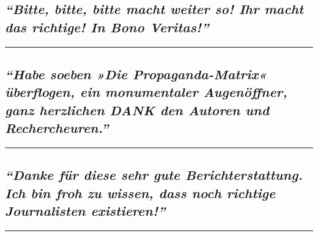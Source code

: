 \hypertarget{bitte-bitte-bitte-macht-weiter-so-ihr-macht-das-richtige-in-bono-veritas}{%
\subsection{\texorpdfstring{\emph{``Bitte, bitte, bitte macht weiter so!
Ihr macht das richtige! In Bono
Veritas!''}}{``Bitte, bitte, bitte macht weiter so! Ihr macht das richtige! In Bono Veritas!''}}\label{bitte-bitte-bitte-macht-weiter-so-ihr-macht-das-richtige-in-bono-veritas}}

\begin{center}\rule{0.5\linewidth}{\linethickness}\end{center}

\hypertarget{habe-soeben-die-propaganda-matrix-uxfcberflogen-ein-monumentaler-augenuxf6ffner-ganz-herzlichen-dank-den-autoren-und-rechercheuren}{%
\subsection{\texorpdfstring{\emph{``Habe soeben »Die Propaganda-Matrix«
überflogen, ein monumentaler Augenöffner, ganz herzlichen DANK den
Autoren und
Rechercheuren.''}}{``Habe soeben »Die Propaganda-Matrix« überflogen, ein monumentaler Augenöffner, ganz herzlichen DANK den Autoren und Rechercheuren.''}}\label{habe-soeben-die-propaganda-matrix-uxfcberflogen-ein-monumentaler-augenuxf6ffner-ganz-herzlichen-dank-den-autoren-und-rechercheuren}}

\begin{center}\rule{0.5\linewidth}{\linethickness}\end{center}

\hypertarget{danke-fuxfcr-diese-sehr-gute-berichterstattung-ich-bin-froh-zu-wissen-dass-noch-richtige-journalisten-existieren}{%
\subsection{\texorpdfstring{\emph{``Danke für diese sehr gute
Berichterstattung. Ich bin froh zu wissen, dass noch richtige
Journalisten
existieren!''}}{``Danke für diese sehr gute Berichterstattung. Ich bin froh zu wissen, dass noch richtige Journalisten existieren!''}}\label{danke-fuxfcr-diese-sehr-gute-berichterstattung-ich-bin-froh-zu-wissen-dass-noch-richtige-journalisten-existieren}}

\begin{center}\rule{0.5\linewidth}{\linethickness}\end{center}

